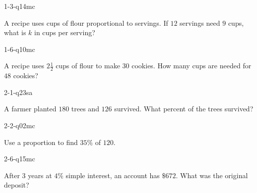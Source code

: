 
\begin{practiceQuestion}{1-3-q14}{mc}
\begin{questionText}
A recipe uses cups of flour proportional to servings. If $12$ servings need $9$ cups, what is $k$ in cups per serving?
\end{questionText}
\end{practiceQuestion}

\begin{practiceQuestion}{1-6-q10}{mc}
\begin{questionText}
A recipe uses $2\frac{1}{2}$ cups of flour to make $30$ cookies. How many cups are needed for $48$ cookies?
\end{questionText}
\end{practiceQuestion}

\begin{practiceQuestion}{2-1-q23}{sa}
\begin{questionText}
A farmer planted $180$ trees and $126$ survived. What percent of the trees survived?
\end{questionText}
\end{practiceQuestion}

\begin{practiceQuestion}{2-2-q02}{mc}
\begin{questionText}
Use a proportion to find $35\%$ of $120$.
\end{questionText}
\end{practiceQuestion}

\begin{practiceQuestion}{2-6-q15}{mc}
\begin{questionText}
After $3$ years at $4\%$ simple interest, an account has $\$672$. What was the original deposit?
\end{questionText}
\end{practiceQuestion}

